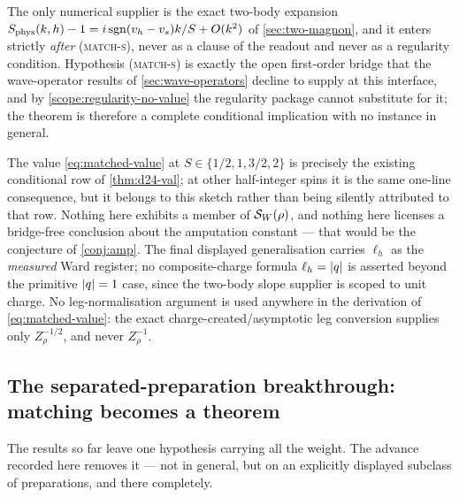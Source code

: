 \begin{scope}
\label{scope:soft-index-matched}
The only numerical supplier is the exact two-body expansion
$S_{\rm phys}(k,h)-1=i\operatorname{sgn}(v_h-v_s)k/S+O(k^2)$ of \cref{sec:two-magnon}, and
it enters strictly \emph{after} \textsc{(match-s)}, never as a clause of the
readout and never as a regularity condition. Hypothesis \textsc{(match-s)} is
exactly the open first-order bridge that the wave-operator results of
\cref{sec:wave-operators} decline to supply at this interface, and by
\cref{scope:regularity-no-value} the regularity package cannot substitute for
it; the theorem is therefore a complete conditional implication with no
instance in general.

The value \cref{eq:matched-value} at $S\in\{1/2,1,3/2,2\}$ is precisely the
existing conditional row of \cref{thm:d24-val}; at other half-integer spins it
is the same one-line consequence, but it belongs to this sketch rather than
being silently attributed to that row. Nothing here exhibits a member of
$\mathcal{S}_W(\rho)$, and nothing here licenses a bridge-free conclusion about the
amputation constant --- that would be the conjecture of \cref{conj:amp}. The
final displayed generalisation carries $\ell_h$ as the \emph{measured} Ward
register; no composite-charge formula $\ell_h=\lvert q\rvert$ is asserted beyond the
primitive $\lvert q\rvert=1$ case, since the two-body slope supplier is scoped to
unit charge. No leg-normalisation argument is used anywhere in the derivation
of \cref{eq:matched-value}: the exact charge-created/asymptotic leg conversion
supplies only $Z_\rho^{-1/2}$, and never $Z_\rho^{-1}$.
\end{scope}


\subsection{The separated-preparation breakthrough: matching becomes a theorem}

The results so far leave one hypothesis carrying all the weight. The advance
recorded here removes it --- not in general, but on an explicitly displayed
subclass of preparations, and there completely.

